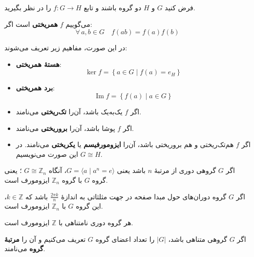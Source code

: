 \begin{definition}[همریختی ]
    فرض کنید $G$ و $H$ دو گروه باشند و تابع $f \colon G \to H$ را در نظر بگیرید.

    می‌گوییم $f$ \textbf{همریختی} است اگر:
    \[
        \forall\, a,b \in G \quad f(ab) = f(a)f(b)
    \]

    در این صورت، مفاهیم زیر تعریف می‌شوند:

    \begin{itemize}
        \item \textbf{هستهٔ همریختی}:
              \[
                  \ker f = \left\{ a \in G \mid f(a) = e_H \right\}
              \]

        \item \textbf{برد همریختی}:
              \[
                  \operatorname{Im} f = \left\{ f(a) \mid a \in G \right\}
              \]

        \item اگر $f$ یک‌به‌یک باشد، آن‌را \textbf{تک‌ریختی}  می‌نامند.

        \item اگر $f$ پوشا باشد، آن‌را \textbf{برو‌ریختی}  می‌نامند.

        \item اگر $f$ هم‌تک‌ریختی و هم برو‌ریختی باشد، آن‌را \textbf{ایزومورفیسم} یا \textbf{یکریختی}  می‌نامند. در این صورت می‌نویسیم $G \cong H$.

    \end{itemize}
\end{definition}



\begin{example}
    اگر $G$ گروهی دوری از مرتبهٔ $n$ باشد یعنی $G = \langle a \mid a^n = e \rangle$، آنگاه $G \cong \mathbb{Z}_n$ ؛ یعنی گروه $G$ با گروه $\mathbb{Z}_n$ ایزومورف است.
\end{example}

\begin{example}
    اگر $G$ گروه دوران‌های حول مبدا صفحه در جهت مثلثاتی به اندازهٔ $\frac{2\pi k}{n}$ باشد که $k \in \mathbb{Z}$، این گروه $G$ با $\mathbb{Z}_n$ ایزومورف است.
\end{example}

\begin{example}
    هر گروه دوری نامتناهی با $\mathbb{Z}$ ایزومورف است.
\end{example}

\begin{definition}
    اگر
    $G$
    گروهی متناهی باشد،
    $|G|$
    را تعداد اعضای گروه
    $G$
    تعریف می‌کنیم و آن را
    \textbf{مرتبهٔ گروه} می‌نامند.
\end{definition}



